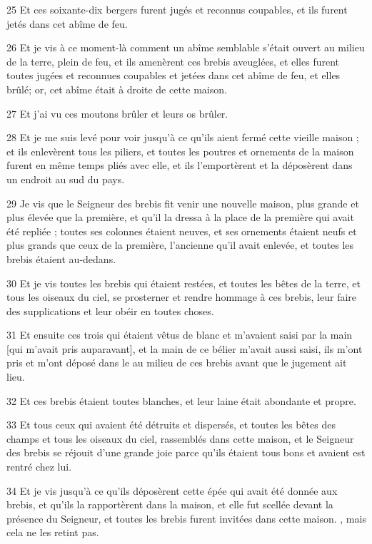 \par 25 Et ces soixante-dix bergers furent jugés et reconnus coupables, et ils furent jetés dans cet abîme de feu.
\par 26 Et je vis à ce moment-là comment un abîme semblable s'était ouvert au milieu de la terre, plein de feu, et ils amenèrent ces brebis aveuglées, et elles furent toutes jugées et reconnues coupables et jetées dans cet abîme de feu, et elles brûlé; or, cet abîme était à droite de cette maison.
\par 27 Et j'ai vu ces moutons brûler et leurs os brûler.
\par 28 Et je me suis levé pour voir jusqu'à ce qu'ils aient fermé cette vieille maison ; et ils enlevèrent tous les piliers, et toutes les poutres et ornements de la maison furent en même temps pliés avec elle, et ils l'emportèrent et la déposèrent dans un endroit au sud du pays.
\par 29 Je vis que le Seigneur des brebis fit venir une nouvelle maison, plus grande et plus élevée que la première, et qu'il la dressa à la place de la première qui avait été repliée ; toutes ses colonnes étaient neuves, et ses ornements étaient neufs et plus grands que ceux de la première, l'ancienne qu'il avait enlevée, et toutes les brebis étaient au-dedans.
\par 30 Et je vis toutes les brebis qui étaient restées, et toutes les bêtes de la terre, et tous les oiseaux du ciel, se prosterner et rendre hommage à ces brebis, leur faire des supplications et leur obéir en toutes choses.
\par 31 Et ensuite ces trois qui étaient vêtus de blanc et m'avaient saisi par la main [qui m'avait pris auparavant], et la main de ce bélier m'avait aussi saisi, ils m'ont pris et m'ont déposé dans le au milieu de ces brebis avant que le jugement ait lieu.
\par 32 Et ces brebis étaient toutes blanches, et leur laine était abondante et propre.
\par 33 Et tous ceux qui avaient été détruits et dispersés, et toutes les bêtes des champs et tous les oiseaux du ciel, rassemblés dans cette maison, et le Seigneur des brebis se réjouit d'une grande joie parce qu'ils étaient tous bons et avaient est rentré chez lui.
\par 34 Et je vis jusqu'à ce qu'ils déposèrent cette épée qui avait été donnée aux brebis, et qu'ils la rapportèrent dans la maison, et elle fut scellée devant la présence du Seigneur, et toutes les brebis furent invitées dans cette maison. , mais cela ne les retint pas.
